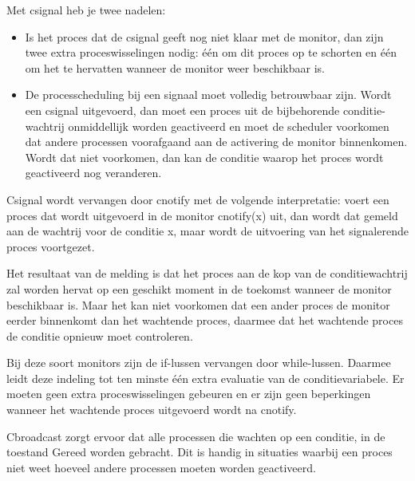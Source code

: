 Met csignal heb je twee nadelen:

\begin{itemize}
\item Is het proces dat de csignal geeft nog niet klaar met de monitor, dan zijn twee extra proceswisselingen nodig: één om dit proces op te schorten en één om het te hervatten wanneer de monitor weer beschikbaar is.
\item De processcheduling bij een signaal moet volledig betrouwbaar zijn. Wordt een csignal uitgevoerd, dan moet een proces uit de bijbehorende conditie-wachtrij onmiddellijk worden geactiveerd en moet de scheduler voorkomen dat andere processen voorafgaand aan de activering de monitor binnenkomen. Wordt dat niet voorkomen, dan kan de conditie waarop het proces wordt geactiveerd nog veranderen.
\end{itemize}

Csignal wordt vervangen door cnotify met de volgende interpretatie: voert een proces dat wordt uitgevoerd in de monitor cnotify(x) uit, dan wordt dat gemeld aan de wachtrij voor de conditie x, maar wordt de uitvoering van het signalerende proces voortgezet.

Het resultaat van de melding is dat het proces aan de kop van de conditiewachtrij zal worden hervat op een geschikt moment in de toekomst wanneer de monitor beschikbaar is. Maar het kan niet voorkomen dat een ander proces de monitor eerder binnenkomt dan het wachtende proces, daarmee dat het wachtende proces de conditie opnieuw moet controleren.

Bij deze soort monitors zijn de if-lussen vervangen door while-lussen. Daarmee leidt deze indeling tot ten minste één extra evaluatie van de conditievariabele. Er moeten geen extra proceswisselingen gebeuren en er zijn geen beperkingen wanneer het wachtende proces uitgevoerd wordt na cnotify.

Cbroadcast zorgt ervoor dat alle processen die wachten op een conditie, in de toestand Gereed worden gebracht. Dit is handig in situaties waarbij een proces niet weet hoeveel andere processen moeten worden geactiveerd.
